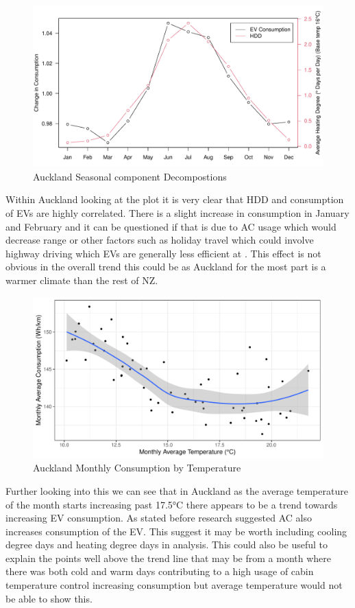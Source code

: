 \documentclass[
]{article}
\begin{document}
\begin{figure}
\centering
\includegraphics{summary_week4_files/figure-latex/eff_HDD_plot-1.pdf}
\caption{Auckland Seasonal component
Decompostions\label{fig:eff_HDD_plot}}
\end{figure}

Within Auckland looking at the plot it is very clear that HDD and
consumption of EVs are highly correlated. There is a slight increase in
consumption in January and February and it can be questioned if that is
due to AC usage which would decrease range \cite{ev_range} or other
factors such as holiday travel which could involve highway driving which
EVs are generally less efficient at \cite{ev_highway}. This effect is
not obvious in the overall trend this could be as Auckland for the most
part is a warmer climate than the rest of NZ.

\begin{figure}
\centering
\includegraphics{summary_week4_files/figure-latex/temp_eff_plot-1.pdf}
\caption{Auckland Monthly Consumption by Temperature}
\end{figure}

Further looking into this we can see that in Auckland as the average
temperature of the month starts increasing past 17.5°C there appears to
be a trend towards increasing EV consumption. As stated before research
\cite{ev_range} suggested AC also increases consumption of the EV. This
suggest it may be worth including cooling degree days and heating degree
days in analysis. This could also be useful to explain the points well
above the trend line that may be from a month where there was both cold
and warm days contributing to a high usage of cabin temperature control
increasing consumption but average temperature would not be able to show
this.
\end{document}
